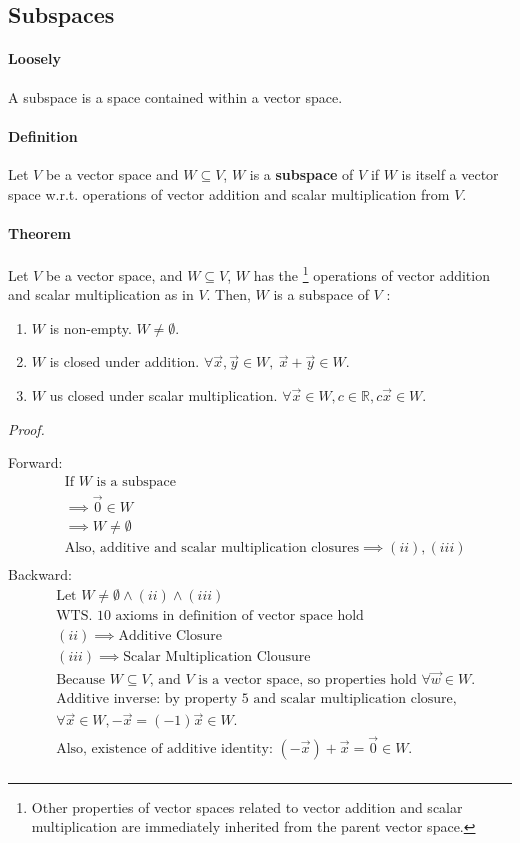 \documentclass[11pt]{article}
\begin{document}
	
	\subsection{Subspaces}
	\paragraph{Loosely} A subspace is a space contained within a vector space.
	\paragraph{Definition} Let $V$ be a vector space and $W \subseteq V $, $W$ is a \textbf{subspace} of $V$ if $W$ is itself a vector space w.r.t. operations of vector addition and scalar multiplication from $V$.
	\paragraph{Theorem} Let $V$ be a vector space, and $W \subseteq V$, $W$ has the \footnote{Other properties of vector spaces related to vector addition and scalar multiplication are immediately inherited from the parent vector space.} operations of vector addition and scalar multiplication as in $V$. Then, $W$ is a subspace of $V$ :
	\begin{enumerate}
		\item $W$ is non-empty. $W \neq \emptyset$.
		\item $W$ is closed under addition. $\forall \vec{x}, \vec{y} \in W,\ \vec{x} + \vec{y} \in W$.
		\item $W$ us closed under scalar multiplication. $\forall \vec{x} \in W, c \in \mathbb{R}, c\vec{x} \in W$.
	\end{enumerate}
	\emph{Proof.}
	
	Forward:
	\begin{align*}
		&\text{If $W$ is a subspace} \\
		&\implies \vec{0} \in W \\
		&\implies W \neq \emptyset \\
		&\text{Also, additive and scalar multiplication closures} \implies (ii), (iii) \\	
	\end{align*}
	Backward:
	\begin{align*}
		&\text{Let } W \neq \emptyset \land (ii) \land (iii) \\
		&\text{WTS. 10 axioms in definition of vector space hold} \\
		&(ii) \implies \text{Additive Closure} \\
		&(iii) \implies \text{Scalar Multiplication Clousure} \\
		&\text{Because $W \subseteq V$, and $V$ is a vector space, so properties hold $\forall \vec{w} \in W$.} \\
		&\text{Additive inverse: by property 5 and scalar multiplication closure, }\\
		&\forall \vec{x} \in W, -\vec{x} = (-1)\vec{x} \in W. \\
		&\text{Also, existence of additive identity: } (-\vec{x}) + \vec{x} = \vec{0} \in W. \\
	\end{align*}
\end{document}
